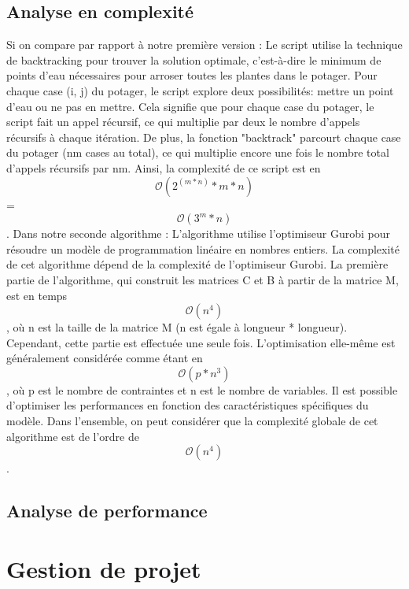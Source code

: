 \documentclass[french,a4paper]{article}
\begin{document}
\subsection{Analyse en complexité}
Si on compare par rapport à notre première version :
\newline
\newline Le script utilise la technique de backtracking pour trouver la solution optimale, c'est-à-dire le minimum de points d'eau nécessaires pour arroser toutes les plantes dans le potager. Pour chaque case (i, j) du potager, le script explore deux possibilités: mettre un point d'eau ou ne pas en mettre. Cela signifie que pour chaque case du potager, le script fait un appel récursif, ce qui multiplie par deux le nombre d'appels récursifs à chaque itération.
De plus, la fonction "backtrack" parcourt chaque case du potager (nm cases au total), ce qui multiplie encore une fois le nombre total d'appels récursifs par nm.
\newline Ainsi, la complexité de ce script est en \[\mathcal{O}(2^(m*n)*m*n)\] = \[\mathcal{O}(3^m*n)\].
\newline Dans notre seconde algorithme :
\newline L'algorithme utilise l'optimiseur Gurobi pour résoudre un modèle de programmation linéaire en nombres entiers. La complexité de cet algorithme dépend de la complexité de l'optimiseur Gurobi.
La première partie de l'algorithme, qui construit les matrices C et B à partir de la matrice M, est en temps \[\mathcal{O}(n^4)\], où n est la taille de la matrice M (n est égale à longueur * longueur). Cependant, cette partie est effectuée une seule fois.
L'optimisation elle-même est généralement considérée comme étant en \[\mathcal{O}(p*n^3)\], où p est le nombre de contraintes et n est le nombre de variables. Il est possible d'optimiser les performances en fonction des caractéristiques spécifiques du modèle.
Dans l'ensemble, on peut considérer que la complexité globale de cet algorithme est de l'ordre de \[\mathcal{O}(n^4)\].
\subsection{Analyse de performance}

\newpage
\section{Gestion de projet}
\end{document}
